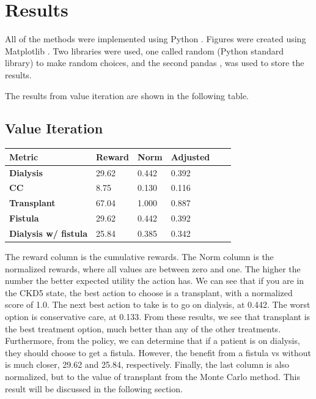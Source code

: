 \documentclass[10pt,twocolumn]{article}
\begin{document}
\section{Results}

All of the methods were implemented using Python \cite{python}. Figures were created using Matplotlib \cite{matplotlib}. Two libraries were used, one called random (Python standard library) to make random choices, and the second pandas \cite{pandas}, was used to store the results. 

The results from value iteration are shown in the following table.

\subsection{Value Iteration}
\begin{center}
  \begin{tabular}{l l l l l l}
  \toprule
  \textbf{Metric} & \textbf{Reward} & \textbf{Norm} & \textbf{Adjusted} \\
  \midrule
  \textbf{Dialysis} & 29.62 & 0.442 & 0.392 \\
  \textbf{CC} & 8.75 & 0.130 & 0.116 \\
  \textbf{Transplant} & 67.04 & 1.000 & 0.887 \\
  \textbf{Fistula} & 29.62 & 0.442 & 0.392 \\
  \textbf{Dialysis w/ fistula} & 25.84 & 0.385 & 0.342 \\
  \end{tabular}
  \label{tab:here}
\end{center}

The reward column is the cumulative rewards. The Norm column is the normalized rewards, where all values are between zero and one. The higher the number the better expected utility the action has. We can see that if you are in the CKD5 state, the best action to choose is a transplant, with a normalized score of 1.0. The next best action to take is to go on dialysis, at 0.442. The worst option is conservative care, at 0.133. From these results, we see that transplant is the best treatment option, much better than any of the other treatments. Furthermore, from the policy, we can determine that if a patient is on dialysis, they should choose to get a fistula. However, the benefit from a fistula vs without is much closer, 29.62 and 25.84, respectively. Finally, the last column is also normalized, but to the value of transplant from the Monte Carlo method. This result will be discussed in the following section.
\end{document}
